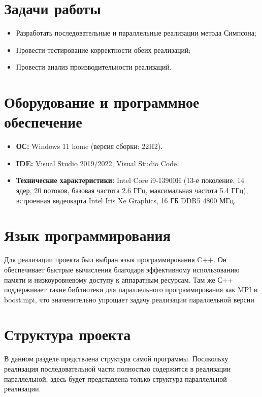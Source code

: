 \documentclass[12pt,a4paper]{article}
\begin{document}
\section*{Задачи работы}

\begin{itemize}
    \item Разработать последовательные и параллельные реализации метода Симпсона;
    \item Провести тестирование корректности обеих реализаций;
    \item Провести анализ производительности реализаций.
\end{itemize}

\section*{Оборудование и программное обеспечение}

\begin{itemize}
    \item \textbf{ОС:} Windows 11 home (версия сборки: 22H2).
    \item \textbf{IDE:} Visual Studio 2019/2022, Visual Studio Code.
    \item \textbf{Технические характеристики:} Intel Core i9-13900H (13-е поколение, 14 ядер, 20 потоков, базовая частота 2.6 ГГц, максимальная частота 5.4 ГГц), встроенная видеокарта Intel Iris Xe Graphics, 16 ГБ DDR5 4800 МГц.
\end{itemize}

\section*{Язык программирования}

Для реализации проекта был выбран язык программирования C++. Он обеспечивает быстрые вычисления благодаря эффективному использованию памяти и низкоуровневому доступу к аппаратным ресурсам. Там же С++  поддерживает такие библиотеки для параллельного программирования как MPI и boost:mpi, что значенительно упрощает задачу реализации параллельной версии

\section*{Структура проекта}

В данном разделе предствлена структура самой программы. Послкольку реализация последовательной части полностью содержится в реализации параллельной, здесь будет представлена только структура параллельной реализации.
\end{document}
